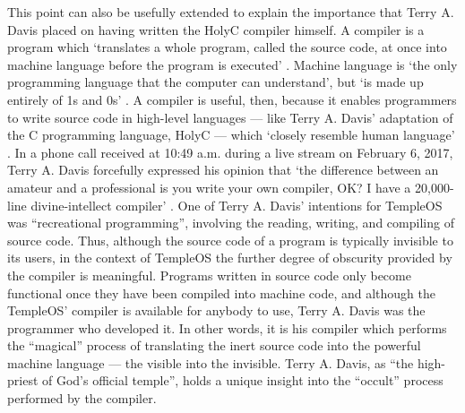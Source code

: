 This point can also be usefully extended to explain
the importance that Terry A. Davis placed
on having written the HolyC compiler himself.
A compiler is a program which `translates a whole program, called the
source code, at once into machine language before the program is executed'
\parencite[323]{Computers}.
Machine language is `the only programming language that the computer can
understand', but `is made up entirely of 1s and 0s'
\parencite[321]{Computers}.
A compiler is useful, then, because it enables programmers to write
source code in high-level languages --- like Terry A. Davis' adaptation of the C
programming language, HolyC --- which `closely resemble human language'
\parencite[323]{Computers}.
In a phone call received at 10:49 a.m. during a live stream
on February 6, 2017, Terry A. Davis  forcefully expressed his opinion that
`the difference between an amateur and a professional is you write your
own compiler, OK? I have a 20,000-line divine-intellect compiler'
\parencite[31:44]{Telephone}.
One of Terry A. Davis' intentions for TempleOS was
``recreational programming'', involving the reading, writing,
and compiling of source code.
Thus, although the source code of a program is typically invisible
to its users, in the context of TempleOS the further degree of obscurity
provided by the compiler is meaningful.
Programs written in source code only become functional
once they have been compiled into machine code, and although the TempleOS'
compiler is available for anybody to use, Terry A. Davis was the programmer
who developed it.
In other words, it is his compiler which performs the ``magical'' process
of translating the inert source code into the powerful
machine language --- the visible into the invisible.
Terry A. Davis, as ``the high-priest of God's official temple'',
holds a unique insight into the ``occult'' process performed by the compiler.

